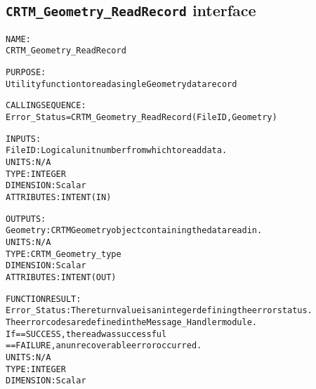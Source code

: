 \subsection{\texttt{CRTM\_Geometry\_ReadRecord} interface}
  \label{sec:CRTM_Geometry_ReadRecord_interface}
  \begin{alltt}
 
  NAME:
        CRTM_Geometry_ReadRecord
 
  PURPOSE:
        Utility function to read a single Geometry data record
 
  CALLING SEQUENCE:
        Error_Status = CRTM_Geometry_ReadRecord( FileID, Geometry )
 
  INPUTS:
        FileID:       Logical unit number from which to read data.
                      UNITS:      N/A
                      TYPE:       INTEGER
                      DIMENSION:  Scalar
                      ATTRIBUTES: INTENT(IN)
 
  OUTPUTS:
        Geometry:     CRTM Geometry object containing the data read in.
                      UNITS:      N/A
                      TYPE:       CRTM_Geometry_type
                      DIMENSION:  Scalar
                      ATTRIBUTES: INTENT(OUT)
 
  FUNCTION RESULT:
        Error_Status: The return value is an integer defining the error status.
                      The error codes are defined in the Message_Handler module.
                      If == SUCCESS, the read was successful
                         == FAILURE, an unrecoverable error occurred.
                      UNITS:      N/A
                      TYPE:       INTEGER
                      DIMENSION:  Scalar
  \end{alltt}
